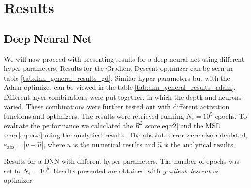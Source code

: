 \section{Results}
\subsection{Deep Neural Net}
We will now proceed with presenting results for a deep neural net using different hyper parameters. Results for the Gradient Descent optimizer can be seen in table \ref{tab:dnn_general_results_gd}. Similar hyper parameters but with the Adam optimizer can be viewed in the table \ref{tab:dnn_general_results_adam}. Different layer combinations were put together, in which the depth and neurons varied. These combinations were further tested out with different activation functions and optimizers. The results were retrieved running $N_\mathrm{e}=10^5$ epochs. To evaluate the performance we caluclated the $R^2$ score\eqref{eq:r2} and the MSE score\eqref{eq:mse} using the analytical results. The absolute error were also calculated, $\varepsilon_{\mathrm{abs}}=|u - \hat{u}|$, where $u$ is the numerical results and $\hat{u}$ is the analytical results.
\begin{table}[h!tb]
    \centering
    \caption{Results for a DNN with different hyper parameters. The number of epochs was set to $N_\mathrm{e}=10^5$. Results presented are obtained with \textit{gradient descent} as optimizer.}
    \label{tab:dnn_general_results_gd}
\end{table}

